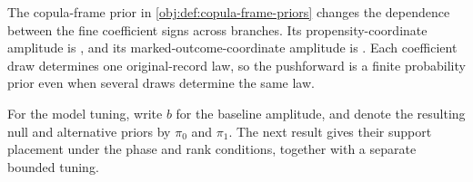 \documentclass[11pt]{article}
\begin{document}
The copula-frame prior  in \cref{obj:def:copula-frame-priors} changes the dependence between the fine coefficient signs across branches. Its propensity-coordinate amplitude is , and its marked-outcome-coordinate amplitude is . Each coefficient draw determines one original-record law, so the pushforward is a finite probability prior even when several draws determine the same law.

For the model tuning, write \(b\) for the baseline amplitude, and denote the resulting null and alternative priors by \(\pi_0\) and \(\pi_1\). The next result gives their support placement under the phase and rank conditions, together with a separate bounded tuning.
\end{document}

